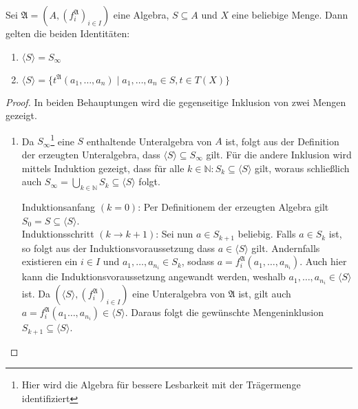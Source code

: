 \begin{proposition}
    Sei $\mathfrak{A}=(A,(f^\mathfrak{A}_i)_{i\in I})$ eine Algebra, $S\subseteq A$ und $X$ eine beliebige Menge. Dann gelten die beiden Identitäten:
    \begin{enumerate}
        \item $\langle S\rangle=S_\infty$
        \item $\langle S\rangle=\{t^\mathfrak{A}(a_1,\ldots,a_n) \mid a_1,\ldots,a_n\in S, t \in T(X) \}$
    \end{enumerate}
\end{proposition}
\begin{proof} In beiden Behauptungen wird die gegenseitige Inklusion von zwei Mengen gezeigt.
    \begin{enumerate}
        \item Da $S_\infty$\footnote{Hier wird die Algebra für bessere Lesbarkeit mit der Trägermenge identifiziert} eine $S$ enthaltende Unteralgebra von $A$ ist, folgt aus der Definition der
        erzeugten Unteralgebra, dass $\langle S\rangle\subseteq S_\infty$ gilt.
        Für die andere Inklusion wird mittels Induktion gezeigt, dass für alle $k\in\mathbb{N}:S_k\subseteq \langle S\rangle$ gilt,
        woraus schließlich auch $S_\infty=\bigcup_{k\in\mathbb{N}}S_k\subseteq \langle S\rangle$ folgt.

        Induktionsanfang $(k=0)$: Per Definitionem der erzeugten Algebra gilt $S_0=S\subseteq \langle S\rangle$. \\
        Induktionsschritt $(k\to k+1)$: Sei nun $a\in S_{k+1}$ beliebig. Falls $a\in S_k$ ist, so folgt aus
        der Induktionsvoraussetzung dass $a\in \langle S\rangle$ gilt. Andernfalls existieren ein $i\in I$ und
        $a_1,\ldots,a_{n_i}\in S_{k}$, sodass $a=f_i^{\mathfrak{A}}(a_1,\ldots,a_{n_i})$. Auch hier kann die Induktionsvoraussetzung
        angewandt werden, weshalb $a_1,\ldots,a_{n_i}\in \langle S\rangle$ ist. Da $(\langle S\rangle,(f_i^{\mathfrak{A}})_{i\in I})$ eine Unteralgebra
        von $\mathfrak{A}$ ist, gilt auch $a=f_i^{\mathfrak{A}}(a_1\ldots,a_{n_i})\in\langle S\rangle$. Daraus folgt die gewünschte Mengeninklusion
        $S_{k+1}\subseteq \langle S\rangle$.


\end{enumerate}
\end{proof}
